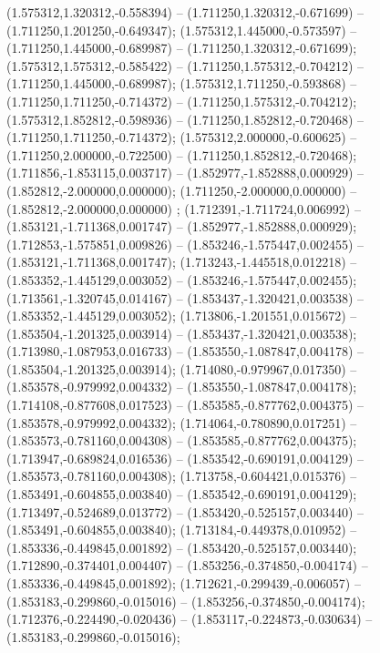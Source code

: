  (1.575312,1.320312,-0.558394) -- (1.711250,1.320312,-0.671699) -- (1.711250,1.201250,-0.649347);
 (1.575312,1.445000,-0.573597) -- (1.711250,1.445000,-0.689987) -- (1.711250,1.320312,-0.671699);
 (1.575312,1.575312,-0.585422) -- (1.711250,1.575312,-0.704212) -- (1.711250,1.445000,-0.689987);
 (1.575312,1.711250,-0.593868) -- (1.711250,1.711250,-0.714372) -- (1.711250,1.575312,-0.704212);
 (1.575312,1.852812,-0.598936) -- (1.711250,1.852812,-0.720468) -- (1.711250,1.711250,-0.714372);
 (1.575312,2.000000,-0.600625) -- (1.711250,2.000000,-0.722500) -- (1.711250,1.852812,-0.720468);
 (1.711856,-1.853115,0.003717) -- (1.852977,-1.852888,0.000929) -- (1.852812,-2.000000,0.000000);
 (1.711250,-2.000000,0.000000) -- (1.852812,-2.000000,0.000000) ;
 (1.712391,-1.711724,0.006992) -- (1.853121,-1.711368,0.001747) -- (1.852977,-1.852888,0.000929);
 (1.712853,-1.575851,0.009826) -- (1.853246,-1.575447,0.002455) -- (1.853121,-1.711368,0.001747);
 (1.713243,-1.445518,0.012218) -- (1.853352,-1.445129,0.003052) -- (1.853246,-1.575447,0.002455);
 (1.713561,-1.320745,0.014167) -- (1.853437,-1.320421,0.003538) -- (1.853352,-1.445129,0.003052);
 (1.713806,-1.201551,0.015672) -- (1.853504,-1.201325,0.003914) -- (1.853437,-1.320421,0.003538);
 (1.713980,-1.087953,0.016733) -- (1.853550,-1.087847,0.004178) -- (1.853504,-1.201325,0.003914);
 (1.714080,-0.979967,0.017350) -- (1.853578,-0.979992,0.004332) -- (1.853550,-1.087847,0.004178);
 (1.714108,-0.877608,0.017523) -- (1.853585,-0.877762,0.004375) -- (1.853578,-0.979992,0.004332);
 (1.714064,-0.780890,0.017251) -- (1.853573,-0.781160,0.004308) -- (1.853585,-0.877762,0.004375);
 (1.713947,-0.689824,0.016536) -- (1.853542,-0.690191,0.004129) -- (1.853573,-0.781160,0.004308);
 (1.713758,-0.604421,0.015376) -- (1.853491,-0.604855,0.003840) -- (1.853542,-0.690191,0.004129);
 (1.713497,-0.524689,0.013772) -- (1.853420,-0.525157,0.003440) -- (1.853491,-0.604855,0.003840);
 (1.713184,-0.449378,0.010952) -- (1.853336,-0.449845,0.001892) -- (1.853420,-0.525157,0.003440);
 (1.712890,-0.374401,0.004407) -- (1.853256,-0.374850,-0.004174) -- (1.853336,-0.449845,0.001892);
 (1.712621,-0.299439,-0.006057) -- (1.853183,-0.299860,-0.015016) -- (1.853256,-0.374850,-0.004174);
 (1.712376,-0.224490,-0.020436) -- (1.853117,-0.224873,-0.030634) -- (1.853183,-0.299860,-0.015016);
